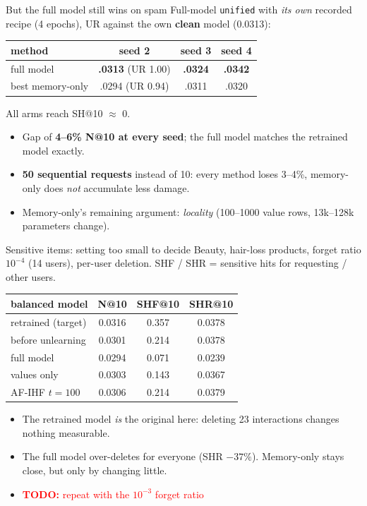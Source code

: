 \documentclass{beamer}
\newcommand{\todo}[1]{\textcolor{red}{\textbf{TODO:} #1}}
\begin{document}
\begin{frame}{But the full model still wins on spam}
Full-model \texttt{unified} with \emph{its own} recorded recipe (4 epochs),
UR against the own \textbf{clean} model (0.0313):
\begin{center}
\small
\begin{tabular}{|l|c|c|c|}
\hline
method & seed 2 & seed 3 & seed 4 \\
\hline
full model           & \textbf{.0313} (UR 1.00) & \textbf{.0324} & \textbf{.0342} \\
best memory-only     & .0294 (UR 0.94) & .0311 & .0320 \\
\hline
\end{tabular}
\end{center}
All arms reach SH@10 $\approx$ 0.

\begin{itemize}
  \item Gap of \textbf{4--6\% N@10 at every seed}; the full model matches the
        retrained model exactly.
  \item \textbf{50 sequential requests} instead of 10: every method loses
        3--4\%, memory-only does \emph{not} accumulate less damage.
  \item Memory-only's remaining argument: \emph{locality} (100--1000 value rows,
        13k--128k parameters change).
\end{itemize}
\end{frame}

\begin{frame}{Sensitive items: setting too small to decide}
Beauty, hair-loss products, forget ratio $10^{-4}$ (14 users), per-user deletion.
SHF / SHR = sensitive hits for requesting / other users.
\begin{center}
\small
\begin{tabular}{|l|c|c|c|}
\hline
balanced model & N@10 & SHF@10 & SHR@10 \\
\hline
retrained (target)   & 0.0316 & 0.357 & 0.0378 \\
before unlearning    & 0.0301 & 0.214 & 0.0378 \\
full model           & 0.0294 & 0.071 & \alert{0.0239} \\
values only          & 0.0303 & 0.143 & 0.0367 \\
AF-IHF $t{=}100$     & 0.0306 & 0.214 & 0.0379 \\
\hline
\end{tabular}
\end{center}

\begin{itemize}
  \item The retrained model \emph{is} the original here: deleting 23
        interactions changes nothing measurable.
  \item The full model \alert{over-deletes for everyone} (SHR $-37\%$).
        Memory-only stays close, but only by changing little.
  \item \todo{repeat with the $10^{-3}$ forget ratio}
\end{itemize}
\end{frame}
\end{document}
